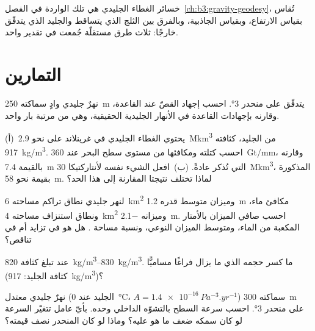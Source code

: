 خسائر الغطاء الجليدي هي تلك الواردة في الفصل~\ref{ch:b3:gravity-geodesy}،
تُقاس بقياس الارتفاع، وبقياس الجاذبية، وبالفرق بين الثلج
الذي يتساقط والجليد الذي يتدفّق خارجًا: ثلاث طرق مستقلّة جُمعت
في تقدير واحد.

\section{التمارين}

\begin{exercise}[$\star$]\label{exo:b3:glaciology:1}
نهرٌ جليدي وادٍ سماكته \qty{250}{m} يتدفّق على منحدر \ang{3}. احسب
إجهاد القصّ عند القاعدة، وقارنه بإجهادات القاعدة في الأنهار الجليدية الحقيقية،
وهي من مرتبة بار واحد.
\end{exercise}

\begin{exercise}[$\star$]\label{exo:b3:glaciology:2}
(أ)~يحتوي الغطاء الجليدي في غرينلاند على نحو \qty{2.9}{\mega km^3} من الجليد،
كثافته \qty{917}{kg/m^3}. احسب كتلته ومكافئها من مستوى سطح البحر عند
\qty{360}{Gt/mm}، وقارنه بالقيمة \qty{7.4}{m} التي تُذكر عادةً.
(ب)~افعل الشيء نفسه لأنتاركتيكا \qty{30}{\mega km^3}، المذكورة بقيمة نحو
\qty{58}{m}. لماذا تختلف نتيجتا المقارنة إلى هذا الحد؟
\end{exercise}

\begin{exercise}[$\star$]\label{exo:b3:glaciology:3}
لنهر جليدي نطاق تراكم مساحته \qty{6}{km^2} وميزان متوسط قدره
\qty{+1.2}{m} مكافئ ماء، ونطاق استنزاف مساحته \qty{4}{km^2} وميزانه
\qty{-2.1}{m}. احسب صافي الميزان بالأمتار المكعبة من الماء، ومتوسط
الميزان النوعي، ونسبة مساحة . هل هو في تزايد أم
في تناقص؟
\end{exercise}

\begin{exercise}[$\star$]\label{exo:b3:glaciology:4}
عند  تبلغ كثافة  \qtyrange{820}{830}{kg/m^3}.
ما كسر حجمه الذي ما يزال فراغًا مساميًّا (كثافة الجليد:
\qty{917}{kg/m^3})؟
\end{exercise}

\begin{exercise}[$\star\star$]\label{exo:b3:glaciology:5}
نهرٌ جليدي معتدل (الجليد عند \qty{0}{\celsius}، $A =
\qty{1.4e-16}{Pa^{-3}.yr^{-1}}$) سماكته \qty{300}{m} على منحدر
\ang{3}. احسب سرعة السطح بالتشوّه الداخلي وحده. بأيّ عامل
تتغيّر السرعة لو كان سمكه ضعف ما هو عليه؟ وماذا لو كان المنحدر
نصف قيمته؟
\end{exercise}

